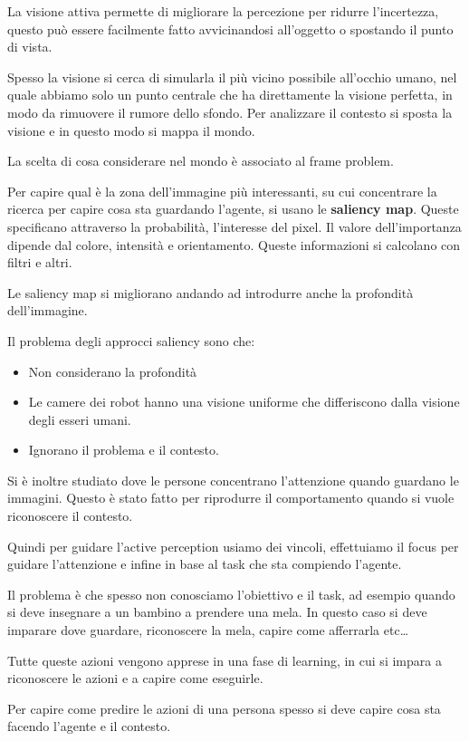La visione attiva permette di migliorare la percezione per ridurre l'incertezza,
questo può essere facilmente fatto avvicinandosi all'oggetto o spostando il 
punto di vista. 

Spesso la visione si cerca di simularla il più vicino possibile all'occhio
umano, nel quale abbiamo solo un punto centrale che ha direttamente la visione 
perfetta, in modo da rimuovere il rumore dello sfondo. Per analizzare il contesto 
si sposta la visione e in questo modo si mappa il mondo.
\begin{nota}
    La scelta di cosa considerare nel mondo è associato al frame problem.
\end{nota}

Per capire qual è la zona dell'immagine più interessanti, su cui concentrare la 
ricerca per capire cosa sta guardando l'agente, si usano le \textbf{saliency map}.
Queste specificano attraverso la probabilità, l'interesse del pixel. Il valore 
dell'importanza dipende dal colore, intensità e orientamento. Queste informazioni 
si calcolano con filtri e altri.

Le saliency map si migliorano andando ad introdurre anche la profondità dell'immagine.

Il problema degli approcci saliency sono che:
\begin{itemize}
    \item Non considerano la profondità
    \item Le camere dei robot hanno una visione uniforme che differiscono dalla
          visione degli esseri umani.
    \item Ignorano il problema e il contesto.
\end{itemize}

Si è inoltre studiato dove le persone concentrano l'attenzione quando guardano
le immagini. Questo è stato fatto per riprodurre il comportamento quando si vuole
riconoscere il contesto.

Quindi per guidare l'active perception usiamo dei vincoli, effettuiamo il focus
per guidare l'attenzione e infine in base al task che sta compiendo l'agente.

Il problema è che spesso non conosciamo l'obiettivo e il task, ad esempio quando 
si deve insegnare a un bambino a prendere una mela. In questo caso si deve
imparare dove guardare, riconoscere la mela, capire come afferrarla etc\dots

Tutte queste azioni vengono apprese in una fase di learning, in cui si impara
a riconoscere le azioni e a capire come eseguirle. 

Per capire come predire le azioni di una persona spesso si deve capire cosa sta
facendo l'agente e il contesto.